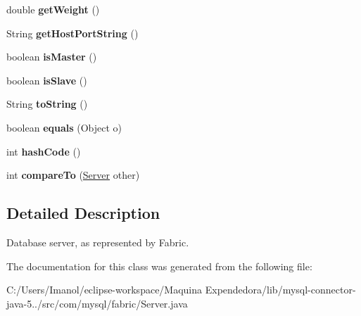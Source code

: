 \begin{DoxyCompactItemize}
double {\bfseries get\+Weight} ()
\item 
\mbox{\label{classcom_1_1mysql_1_1fabric_1_1_server_a98be2e317aa54865138c78c757ce0910}} 
String {\bfseries get\+Host\+Port\+String} ()
\item 
\mbox{\label{classcom_1_1mysql_1_1fabric_1_1_server_aca2362f4d9dff4e84065d711e1b9c8de}} 
boolean {\bfseries is\+Master} ()
\item 
\mbox{\label{classcom_1_1mysql_1_1fabric_1_1_server_a59ffb4e5f6752ed9fdc4c734e76f0fa1}} 
boolean {\bfseries is\+Slave} ()
\item 
\mbox{\label{classcom_1_1mysql_1_1fabric_1_1_server_a920a792fdf621df769840dc68fb8153d}} 
String {\bfseries to\+String} ()
\item 
\mbox{\label{classcom_1_1mysql_1_1fabric_1_1_server_aea3e9c747dc1dbcfc7ba38f6e35e01ab}} 
boolean {\bfseries equals} (Object o)
\item 
\mbox{\label{classcom_1_1mysql_1_1fabric_1_1_server_a0c11132ff2e7b7066da64f9da7755c18}} 
int {\bfseries hash\+Code} ()
\item 
\mbox{\label{classcom_1_1mysql_1_1fabric_1_1_server_aa34ecb9ed80dc8cf2232ec4518314caa}} 
int {\bfseries compare\+To} (\mbox{\hyperlink{classcom_1_1mysql_1_1fabric_1_1_server}{Server}} other)
\end{DoxyCompactItemize}


\subsection{Detailed Description}
Database server, as represented by Fabric. 

The documentation for this class was generated from the following file\+:\begin{DoxyCompactItemize}
\item 
C\+:/\+Users/\+Imanol/eclipse-\/workspace/\+Maquina Expendedora/lib/mysql-\/connector-\/java-\/5../src/com/mysql/fabric/Server.\+java\end{DoxyCompactItemize}
